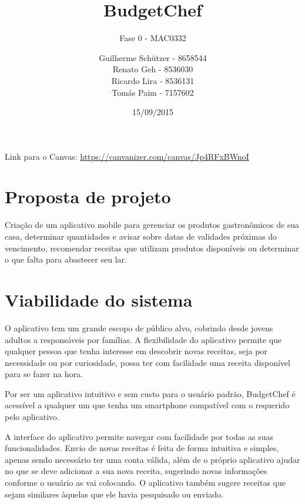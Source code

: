 \documentclass[a4paper]{article}
\title{BudgetChef}
\subtitle{Fase 0 - MAC0332}
\author{
	Guilherme Schützer - 8658544\\
	Renato Geh - 8536030\\
	Ricardo Lira - 8536131\\
	Tomás Paim - 7157602\\
}
\date{15/09/2015}
\begin{document}
\maketitle

Link para o Canvas: \url{https://canvanizer.com/canvas/Jp4RFxBWnoI}

\section{Proposta de projeto}

Criação de um aplicativo mobile para gerenciar os produtos gastronômicos de sua casa, determinar quantidades e avisar sobre datas de validades próximas do vencimento, recomendar receitas que utilizam produtos disponíveis ou determinar o que falta para abastecer seu lar.

\section{Viabilidade do sistema}

O aplicativo tem um grande escopo de público alvo, cobrindo desde jovens adultos a responsáveis por famílias. A flexibilidade do aplicativo permite que qualquer pessoa que tenha interesse em descobrir novas receitas, seja por necessidade ou por curiosidade, possa ter com facilidade uma receita disponível para se fazer na hora.

\par Por ser um aplicativo intuitivo e sem custo para o usuário padrão, BudgetChef é acessível a qualquer um que tenha um smartphone compatível com o requerido pelo aplicativo.

\par A interface do aplicativo permite navegar com facilidade por todas as suas funcionalidades. Envio de novas receitas é feita de forma intuitiva e simples, apenas sendo necessário ter uma conta válida, além de o próprio aplicativo ajudar no que se deve adicionar a sua nova receita, sugerindo novas informações conforme o usuário as vai colocando. O aplicativo também sugere receitas que sejam similares àquelas que ele havia pesquisado ou enviado.
\end{document}
